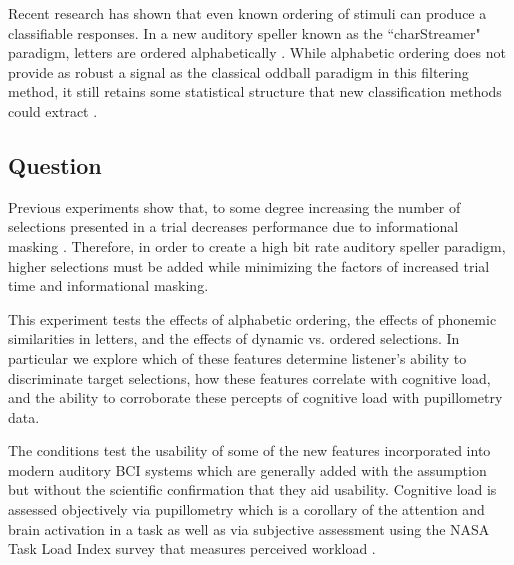 \documentclass[10pt]{article}
\begin{document}
Recent research has shown that even known ordering of stimuli can
produce a classifiable responses.  In a new auditory speller known
as the “charStreamer" paradigm, letters are ordered
alphabetically \cite{Hohne2014}.  While alphabetic ordering does not
provide as robust a signal as the classical oddball paradigm in this
filtering method, it still retains some statistical structure that
new classification methods could extract \cite{Hohne2014}.  



\subsection{Question}

Previous experiments show that, to some degree increasing the number
of selections presented in a trial decreases performance due to
informational masking \cite{Maddox2012a}. Therefore, in order to
create a high bit rate auditory speller paradigm, higher selections
must be added while minimizing the factors of increased trial time
and informational masking. 

This experiment tests the effects of alphabetic ordering, the
effects of phonemic similarities in letters, and the
effects of dynamic vs. ordered selections.  In particular we explore 
which of these features determine listener's ability to discriminate
target selections, how these features correlate with cognitive load,
and the ability to corroborate these percepts of cognitive load with
pupillometry data.

The conditions test the usability of some of the new features
incorporated into modern auditory BCI systems which are generally
added with the assumption but without the scientific confirmation
that they aid usability.  Cognitive load is assessed objectively via
pupillometry which is a corollary of the attention and brain
activation in a task as well as via subjective assessment using the
NASA Task Load Index survey that measures perceived workload
\cite{Zickler2013a}.  

\end{document}
